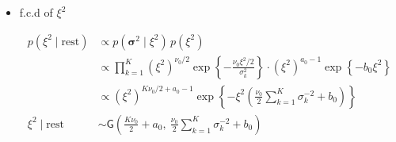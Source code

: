 \begin{appendix}
\begin{itemize}
\begin{equation}
\begin{split}
p(\bm{\beta} \mid \text{rest}) 
&\propto  p(\bm{\xi} \mid\bm{\beta},\bm{\Sigma}) p(\bm{\beta}) \\
&\propto \prod_{k=1}^{K} 
\exp\left\{ -\frac{1}{2} (\bm{\beta}_k - \bm{\beta})^\top \bm{\Sigma}^{-1} (\bm{\beta}_k - \bm{\beta}) \right\}
\times 
\exp\left\{ -\frac{1}{2} (\bm{\beta} - \bm{\mu}_0)^\top \bm{\Lambda}_0^{-1} (\bm{\beta} - \bm{\mu}_0) \right\} \\
&\propto \exp\left\{ -\frac{1}{2} \sum_{k=1}^{K}
(\bm{\beta}_k - \bm{\beta})^\top \bm{\Sigma}^{-1} (\bm{\beta}_k - \bm{\beta}) \right\}
\times 
\exp\left\{ -\frac{1}{2} (\bm{\beta} - \bm{\mu}_0)^\top \bm{\Lambda}_0^{-1} (\bm{\beta} - \bm{\mu}_0) \right\} \\
&\propto \exp\left\{ 
-\frac{1}{2} \left[
K \bm{\beta}^\top \bm{\Sigma}^{-1} \bm{\beta}
- 2 \bm{\beta}^\top \bm{\Sigma}^{-1} \sum_{k=1}^{K} \bm{\beta}_k
\right]
\right\} \\
&\quad \times 
\exp\left\{ 
-\frac{1}{2} \left[
\bm{\beta}^\top \bm{\Lambda}_0^{-1} \bm{\beta}
- 2 \bm{\beta}^\top \bm{\Lambda}_0^{-1} \bm{\mu}_0
\right]
\right\} \\
&\propto \exp\left\{ 
-\frac{1}{2} \left[\bm{\beta}^\top 
\left( K \bm{\Sigma}^{-1} + \bm{\Lambda}_0^{-1} \right) \bm{\beta} 
+ \bm{\beta}^\top 
\left( \bm{\Lambda}_0^{-1} \bm{\mu}_0 + \bm{\Sigma}^{-1} \sum_{k=1}^{K} \bm{\beta}_k \right)\right]
\right\}\\
\bm{\beta} \mid \text{rest} \sim & \mathsf{N_p}\left(\left( K \bm{\Sigma}^{-1} + \bm{\Lambda}_0^{-1} \right)^{-1}\left( \bm{\Lambda}_0^{-1} \bm{\mu}_0 + \bm{\Sigma}^{-1} \sum_{k=1}^{K} \bm{\beta}_k \right), \left( K \bm{\Sigma}^{-1} + \bm{\Lambda}_0^{-1} \right)^{-1}\right)
\end{split}
\end{equation}

\item f.c.d of $\xi^2$

\begin{equation}
\begin{split}
p(\xi^2 \mid \text{rest}) 
&\propto p(\bm{\sigma}^2 \mid \xi^2) 
\, p(\xi^2) \\
&\propto \prod_{k=1}^{K} (\xi^2)^{\nu_0 / 2} 
\exp\left\{ -\frac{\nu_0 \xi^2 / 2}{\sigma_k^2} \right\}
\cdot (\xi^2)^{a_0 - 1} 
\exp\left\{ -b_0 \xi^2 \right\} \\[6pt]
&\propto (\xi^2)^{K \nu_0 / 2 + a_0 - 1} 
\exp\left\{ -\xi^2 \left( \frac{\nu_0}{2} \sum_{k=1}^{K} \sigma_k^{-2} + b_0 \right) \right\}\\
\xi^2 \mid \text{rest} &\sim \mathsf{G} \left(
\frac{K \nu_0}{2} + a_0,\ 
\frac{\nu_0}{2} \sum_{k=1}^{K} \sigma_k^{-2} + b_0
\right)
\end{split}
\end{equation}


\end{itemize}
\end{appendix}

